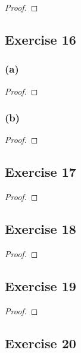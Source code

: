 \documentclass[14pt]{extarticle}
\begin{document}
\begin{proof}

\end{proof}

\subsection{Exercise 16}

\subsubsection{(a)}

\begin{proof}

\end{proof}

\subsubsection{(b)}

\begin{proof}

\end{proof}

\subsection{Exercise 17}

\begin{proof}

\end{proof}

\subsection{Exercise 18}

\begin{proof}

\end{proof}

\subsection{Exercise 19}

\begin{proof}

\end{proof}

\subsection{Exercise 20}
\end{document}
